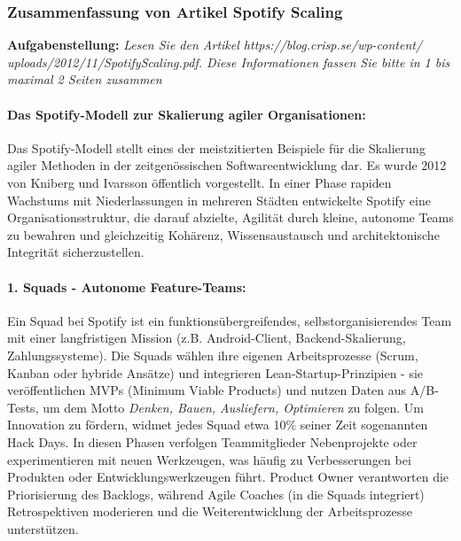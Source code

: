 



\subsubsection{Zusammenfassung von Artikel Spotify Scaling}
\textbf{Aufgabenstellung:} \textit{Lesen Sie den Artikel https://blog.crisp.se/wp-content/ \\
uploads/2012/11/SpotifyScaling.pdf.
Diese Informationen fassen Sie bitte in 1 bis maximal 2 Seiten zusammen}

\paragraph{Das Spotify-Modell zur Skalierung agiler Organisationen:}Das Spotify-Modell stellt eines der meistzitierten Beispiele für die Skalierung agiler Methoden in der zeitgenössischen Softwareentwicklung dar. 
Es wurde 2012 von Kniberg und Ivarsson öffentlich vorgestellt. In einer Phase rapiden Wachstums mit Niederlassungen in mehreren Städten entwickelte Spotify eine Organisationsstruktur, die darauf abzielte, 
Agilität durch kleine, autonome Teams zu bewahren und gleichzeitig Kohärenz, Wissensaustausch und architektonische Integrität sicherzustellen.
\paragraph{1. Squads - Autonome Feature-Teams:}Ein Squad bei Spotify ist ein funktionsübergreifendes, selbstorganisierendes Team mit einer langfristigen Mission (z.B. Android-Client, Backend-Skalierung, Zahlungssysteme). 
Die Squads wählen ihre eigenen Arbeitsprozesse (Scrum, Kanban oder hybride Ansätze) und integrieren Lean-Startup-Prinzipien - sie veröffentlichen MVPs (Minimum Viable Products) und nutzen Daten aus A/B-Tests, um dem Motto \textit{Denken, Bauen, Ausliefern, Optimieren} zu folgen.
Um Innovation zu fördern, widmet jedes Squad etwa 10\% seiner Zeit sogenannten Hack Days. In diesen Phasen verfolgen Teammitglieder Nebenprojekte oder experimentieren mit neuen Werkzeugen, was häufig zu Verbesserungen bei Produkten oder Entwicklungswerkzeugen führt. Product Owner verantworten die Priorisierung des Backlogs, während Agile Coaches (in die Squads integriert) Retrospektiven moderieren und die Weiterentwicklung der Arbeitsprozesse unterstützen.
